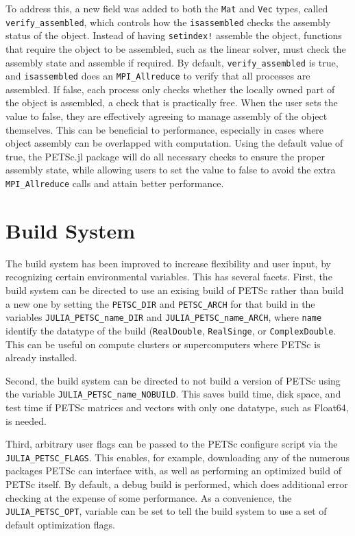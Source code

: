 \documentclass{article}
\begin{document}
To address this, a new field was added 
to both the \texttt{Mat} and \texttt{Vec} types, called 
\texttt{verify\_assembled}, which controls how the \texttt{isassembled} checks
the assembly status of the object.  Instead of having \texttt{setindex!}
assemble the object, functions that require the object to be assembled, such
as the linear solver, must 
check the assembly state and assemble if required.  
By default, \texttt{verify\_assembled} is true, and \texttt{isassembled} does
an \texttt{MPI\_Allreduce} to verify that all processes are assembled.  If
false, each process only checks whether the locally owned part of the object
is assembled, a check that is practically free.  When the user sets the 
value to false, they are effectively agreeing to manage assembly of the 
object themselves.  This can be beneficial to performance, especially in cases
where object assembly can be overlapped with computation.  Using the default 
value of true, the PETSc.jl package will do all necessary checks to ensure
the proper assembly state, while allowing users to set the value to false to 
avoid the extra \texttt{MPI\_Allreduce} calls and attain better performance.

\section{Build System}
The build system has been improved to increase flexibility and user input, by
recognizing certain environmental variables.  This has several facets.  
First, the build system can be directed to use an exising build of PETSc 
rather than build a new one by setting the \texttt{PETSC\_DIR} and 
\texttt{PETSC\_ARCH} for that build in the variables 
\texttt{JULIA\_PETSC\_name\_DIR} and \texttt{JULIA\_PETSC\_name\_ARCH}, where \texttt{name} identify the datatype of the build (\texttt{RealDouble}, 
\texttt{RealSinge}, or \texttt{ComplexDouble}.  This can be useful on compute
clusters or supercomputers where PETSc is already installed.  

Second, the build system can be directed to not build a version of PETSc using
the variable \texttt{JULIA\_PETSC\_name\_NOBUILD}.  This saves build time, 
disk space, and test time if PETSc matrices and vectors with only one datatype,
 such as Float64, is needed.

Third, arbitrary user flags can be passed to the PETSc configure script via
the \texttt{JULIA\_PETSC\_FLAGS}.  This enables, for example, downloading 
any of the numerous packages PETSc can interface with, as well as performing 
an optimized build of PETSc itself.  By default, a debug build is performed, 
which does additional error checking at the expense of some performance.  
As a convenience, the \texttt{JULIA\_PETSC\_OPT}, variable can be set to tell
the build system to use a set of default optimization flags.
\end{document}
